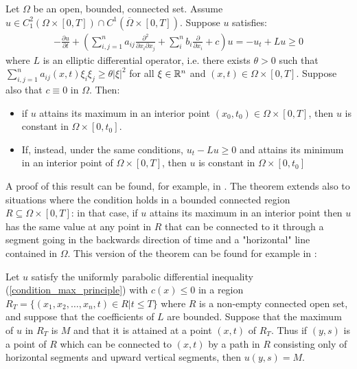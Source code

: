 \begin{theorem}\label{maximum_principle}
	Let $\Omega$ be an open, bounded, connected set. Assume $u\in C^2_1(\Omega\times [0, T])\cap C^1(\overline{\Omega}\times [0, T])$. Suppose $u$ satisfies: 
	\begin{align}
		-\frac{\partial u}{\partial t} + \left(\sum_{i, j=1}^n a_{ij}\frac{\partial^2 }{\partial x_i\partial x_j}+\sum_{i}^n b_{i}\frac{\partial }{\partial x_i} + c\right)  u = -u_t + Lu \geq 0 \label{condition_max_principle}
	\end{align}
	where $L$ is an elliptic differential operator, i.e. there exists $\theta>0$ such that $\sum_{i,j=1}^{n} a_{ij}(x, t) \xi_i\xi_j \geq \theta |\xi |^2$ for all $\xi \in \mathbb{R}^n$ and $(x, t) \in \Omega\times[0, T]$. Suppose also that $c\equiv 0$ in $\Omega$. Then: \begin{itemize}
		\item if $u$ attains its maximum in an interior point $(x_0, t_0)\in\Omega\times [0, T]$, then $u$ is constant in $\Omega\times [0, t_0]$.
		\item If, instead, under the same conditions, $u_t- Lu \geq 0$ and attains its minimum in an interior point of $\Omega\times [0, T]$, then $u$ is constant in $\Omega\times [0, t_0]$
	\end{itemize}
\end{theorem}
A proof of this result can be found, for example, in \cite{Evans}. The theorem extends also to situations where the condition holds in a bounded connected region $R\subseteq \Omega \times [0, T]$: in that case, if $u$ attains its maximum in an interior point then $u$ has the same value at any point in $R$ that can be connected to it through a segment going in the backwards direction of time and a "horizontal" line contained in $\Omega$. This version of the theorem can be found for example in \cite{protterweinberger}: 
\begin{theorem}
	Let $u$ satisfy the uniformly parabolic differential inequality (\ref{condition_max_principle}) with $c(x)\leq 0$
	in a region $R_T =\{(x_1,x_2, \dots ,x_n ,t)\in R\vert t\leq T\}$ where $R$ is a non-empty connected open set, and suppose that the coefficients of $L$ are bounded. Suppose that the maximum of $u$ in $R_T$ is $M$ and that it is attained at a point $(x, t)$ of $R_T$. Thus if $(y,s)$ is a point of $R$ which can be connected to $(x,t)$ by a path in $R$ consisting only of horizontal segments and upward vertical segments, then $u(y,s) = M$.\label{maxprincprotterweinberger}
\end{theorem}

